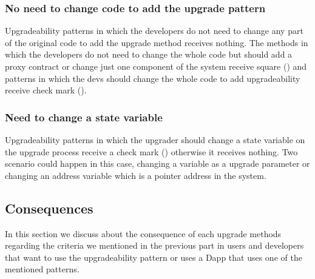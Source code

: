 \subsubsection{No need to change code to add the upgrade pattern}
Upgradeability patterns in which the developers do not need to change any part of the original code to add the upgrade method receives nothing. The methods in which the developers do not need to change the whole code but should add a proxy contract or change just one component of the system receive square (\XBox) and patterns in which the devs should change the whole code to add upgradeability receive check mark (\checkmark).

\subsubsection{Need to change a state variable}
Upgradeability patterns in which the upgrader should change a state variable on the upgrade process receive a check mark (\checkmark) otherwise it receives nothing. Two scenario could happen in this case, changing a variable as a upgrade parameter or changing an address variable which is a pointer address in the system. 



\subsection{Consequences}
In this section we discuss about the consequence of each upgrade methods regarding the criteria we mentioned in the previous part in users and developers that want to use the upgradeability pattern or uses a Dapp that uses one of the mentioned patterns.

